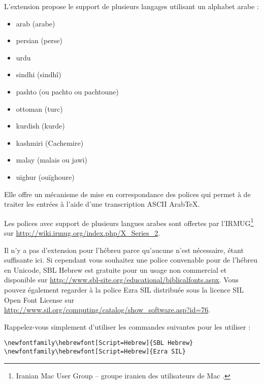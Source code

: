 L'extension \cite{arabxetex} propose le support de
plusieurs langages utilisant un alphabet arabe :

\begin{itemize}
\item arab (arabe) 
\item persian (perse) 
\item urdu 
\item sindhi (sindhî) 
\item pashto (ou pachto ou pachtoune) 
\item ottoman (turc) 
\item kurdish (kurde) 
\item kashmiri (Cachemire) 
\item malay (malais ou jawi) 
\item uighur (ouïghoure) 
\end{itemize}

Elle offre un mécanisme de mise en correspondance des polices qui
permet à  de traiter les entrées à l'aide d'une
transcription ASCII Arab\TeX.

Les polices avec support de plusieurs langues arabes sont offertes
par l'IRMUG\footnote{Iranian Mac User Group -- groupe iranien des
  utilisateurs de Mac \NdT.} sur
\url{http://wiki.irmug.org/index.php/X_Series_2}.

Il n'y a pas d'extension pour l'hébreu parce qu'aucune
n'est nécessaire,  étant suffisante ici. Si cependant
vous souhaitez une police convenable pour de l'hébreu en Unicode, SBL
Hebrew est gratuite pour un usage non commercial et disponible sur
\url{http://www.sbl-site.org/educational/biblicalfonts.aspx}. Vous
pouvez également regarder à la police Ezra SIL distribuée sous la
licence SIL Open Font License sur
\url{http://www.sil.org/computing/catalog/show_software.asp?id=76}.

Rappelez-vous simplement d'utiliser les commandes suivantes pour les
utiliser :

\begin{lscommand}
\verb|\newfontfamily\hebrewfont[Script=Hebrew]{SBL Hebrew}| \\
\verb|\newfontfamily\hebrewfont[Script=Hebrew]{Ezra SIL}|
\end{lscommand}

